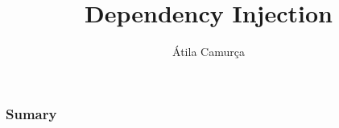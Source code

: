 \documentclass[10pt]{beamer}
\title{Dependency Injection}
\author{Átila Camurça}
\begin{document}
\begin{frame}
\titlepage
\end{frame}

\begin{frame}\frametitle{Sumary}
\tableofcontents
\end{frame}


\end{document}
